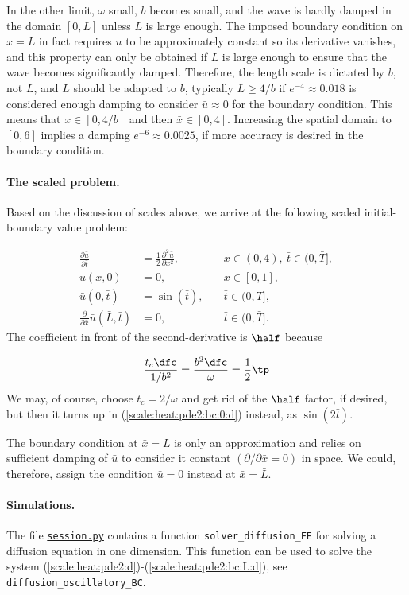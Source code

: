 \documentclass[graybox,envcountchap,sectrefs,final]{svmonodo}
\begin{document}
In the other limit, $\omega$ small, $b$ becomes small, and the wave is
hardly damped in the domain $[0,L]$ unless $L$ is large enough.  The
imposed boundary condition on $x=L$ in fact requires $u$ to be
approximately constant so its derivative vanishes, and this property
can only be obtained if $L$ is large enough to ensure that the wave
becomes significantly damped.  Therefore, the length scale is dictated
by $b$, not $L$, and $L$ should be adapted to $b$, typically $L\geq
4/b$ if $e^{-4}\approx 0.018$ is considered enough damping to
consider $\bar u\approx 0$ for the boundary condition.
This means that $x\in [0,4/b]$ and then $\bar x\in [0,4]$.
Increasing the spatial domain to $[0,6]$ implies a damping $e^{-6}\approx
0.0025$, if more accuracy is desired in the boundary condition.

\paragraph{The scaled problem.}
Based on the discussion of scales above, we arrive at the following
scaled initial-boundary value problem:

\begin{align}
\frac{\partial \bar u}{\partial \bar t} &=
\frac{1}{2}\frac{\partial^2\bar u}{\partial x^2},
\quad & \bar x\in (0,4),\ \bar t\in (0,\bar T],
\label{scale:heat:pde2:d}\\ 
\bar u(\bar x,0) &= 0,
\quad &\bar x\in [0,1],
\label{scale:heat:pde2:ic:u:d}\\ 
\bar u(0,\bar t) & = \sin(\bar t),
\quad  &\bar t\in (0,\bar T],
\label{scale:heat:pde2:bc:0:d}\\ 
\frac{\partial}{\partial\bar x}\bar u(\bar L,\bar t) & = 0,
\quad &\bar t\in (0,\bar T].
\label{scale:heat:pde2:bc:L:d}
\end{align}
The coefficient in front of the second-derivative is $\half$ because

\[ \frac{t_c\dfc}{1/b^2} = \frac{b^2\dfc}{\omega}
= \frac{1}{2}\tp\]
We may, of course, choose $t_c=2/\omega$ and get rid of the $\half$ factor,
if desired, but then it turns up in (\ref{scale:heat:pde2:bc:0:d}) instead,
as $\sin (2\bar t)$.

The boundary condition at $\bar x=\bar L$ is only an approximation and
relies on sufficient damping of $\bar u$ to consider it constant
$(\partial/\partial\bar x =0)$ in
space. We could, therefore, assign the condition $\bar u = 0$ instead
at $\bar x=\bar L$.

\paragraph{Simulations.}
The file \href{{http://tinyurl.com/o8pb3yy/session.py}}{\nolinkurl{session.py}} contains a function
\Verb!solver_diffusion_FE! for solving a diffusion equation in one dimension.
This function can be used to solve the
system (\ref{scale:heat:pde2:d})-(\ref{scale:heat:pde2:bc:L:d}),
see \Verb!diffusion_oscillatory_BC!.
\end{document}
